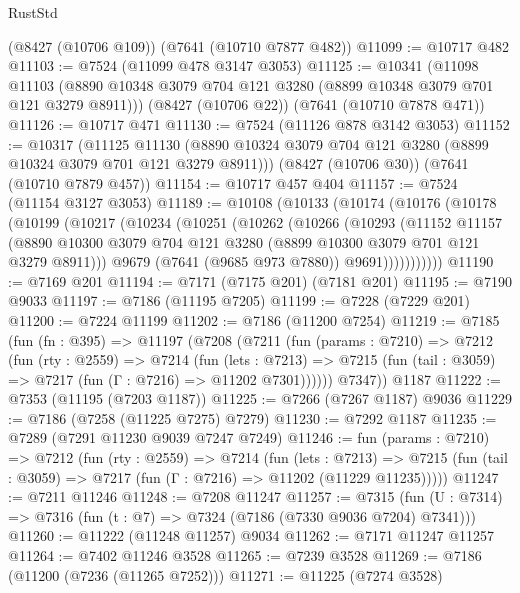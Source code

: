 \begin{lexlean}{RustStd}
\begin{coremodule}
    (@8427 (@10706 @109))
    (@7641 (@10710 @7877 @482))
@11099 := @10717 @482
@11103 := @7524 (@11099 @478 @3147 @3053)
@11125 := @10341
    (@11098 @11103 (@8890 @10348 @3079 @704 @121 @3280 (@8899 @10348 @3079 @701 @121 @3279 @8911)))
    (@8427 (@10706 @22))
    (@7641 (@10710 @7878 @471))
@11126 := @10717 @471
@11130 := @7524 (@11126 @878 @3142 @3053)
@11152 := @10317
    (@11125 @11130 (@8890 @10324 @3079 @704 @121 @3280 (@8899 @10324 @3079 @701 @121 @3279 @8911)))
    (@8427 (@10706 @30))
    (@7641 (@10710 @7879 @457))
@11154 := @10717 @457 @404
@11157 := @7524 (@11154 @3127 @3053)
@11189 := @10108
    (@10133
      (@10174
        (@10176
          (@10178
            (@10199
              (@10217
                (@10234
                  (@10251
                    (@10262
                      (@10266
                        (@10293
                          (@11152
                            @11157
                            (@8890
                              @10300
                              @3079
                              @704
                              @121
                              @3280
                              (@8899 @10300 @3079 @701 @121 @3279 @8911)))
                          @9679
                          (@7641 (@9685 @973 @7880))
                          @9691)))))))))))
@11190 := @7169 @201
@11194 := @7171 (@7175 @201) (@7181 @201)
@11195 := @7190 @9033
@11197 := @7186 (@11195 @7205)
@11199 := @7228 (@7229 @201)
@11200 := @7224 @11199
@11202 := @7186 (@11200 @7254)
@11219 := @7185
    (fun (fn : @395) =>
    @11197
      (@7208
        (@7211
          (fun (params : @7210) =>
          @7212
            (fun (rty : @2559) =>
            @7214
              (fun (lets : @7213) =>
              @7215 (fun (tail : @3059) => @7217 (fun (Γ : @7216) => @11202 @7301))))))
        @7347))
    @1187
@11222 := @7353 (@11195 (@7203 @1187))
@11225 := @7266 (@7267 @1187) @9036
@11229 := @7186 (@7258 (@11225 @7275) @7279)
@11230 := @7292 @1187
@11235 := @7289 (@7291 @11230 @9039 @7247 @7249)
@11246 := fun (params : @7210) =>
  @7212
    (fun (rty : @2559) =>
    @7214
      (fun (lets : @7213) =>
      @7215 (fun (tail : @3059) => @7217 (fun (Γ : @7216) => @11202 (@11229 @11235)))))
@11247 := @7211 @11246
@11248 := @7208 @11247
@11257 := @7315 (fun (U : @7314) => @7316 (fun (t : @7) => @7324 (@7186 (@7330 @9036 @7204) @7341)))
@11260 := @11222 (@11248 @11257) @9034
@11262 := @7171 @11247 @11257
@11264 := @7402 @11246 @3528
@11265 := @7239 @3528
@11269 := @7186 (@11200 (@7236 (@11265 @7252)))
@11271 := @11225 (@7274 @3528)

\end{coremodule}
\end{lexlean}
